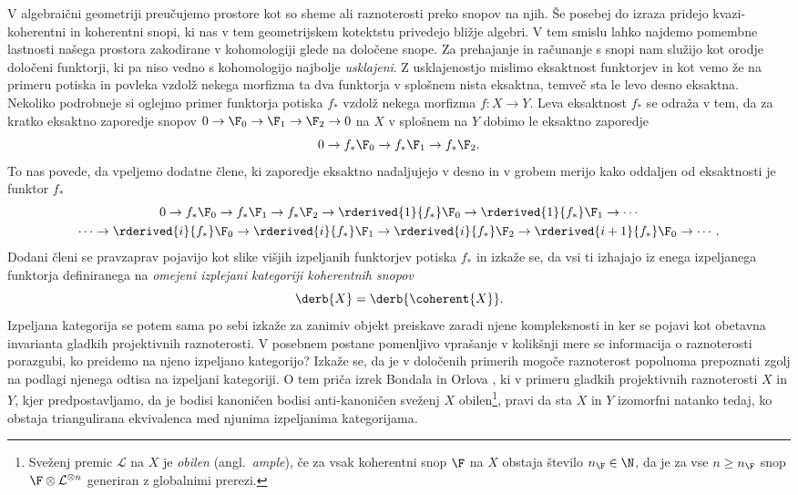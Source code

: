 

V algebraični geometriji preučujemo prostore kot so sheme ali raznoterosti preko snopov na njih. Še posebej do izraza pridejo kvazi-koherentni in koherentni snopi, ki nas v tem geometrijskem kotektstu privedejo bližje algebri. V tem smislu lahko najdemo pomembne lastnosti našega prostora zakodirane v kohomologiji glede na določene snope.
Za prehajanje in računanje s snopi nam služijo kot orodje določeni funktorji, ki pa niso vedno s kohomologijo najbolje \emph{usklajeni}. 
Z usklajenostjo mislimo eksaktnost funktorjev in kot vemo že na primeru potiska in povleka vzdolž nekega morfizma ta dva funktorja v splošnem nista eksaktna, temveč sta le levo \oz desno eksaktna. Nekoliko podrobneje si oglejmo primer funktorja potiska $f_*$ vzdolž nekega morfizma $f \colon X \to Y$. Leva eksaktnost $f_*$ se odraža v tem, da za kratko eksaktno zaporedje snopov $0 \to \F_0 \to \F_1 \to \F_2 \to 0$ na $X$ v splošnem na $Y$ dobimo le eksaktno zaporedje
\[
    0 \to f_*\F_0 \to f_*\F_1 \to f_*\F_2.
\]
To nas povede, da vpeljemo dodatne člene, ki zaporedje eksaktno nadaljujejo v desno in v grobem merijo kako oddaljen od eksaktnosti je funktor $f_*$
\begin{multline*}
    0 \to f_*\F_0 \to f_*\F_1 \to f_*\F_2 \to \rderived{1}{f_*}\F_0 \to \rderived{1}{f_*}\F_1 \to \cdots \\
    \cdots \to \rderived{i}{f_*}\F_0 \to \rderived{i}{f_*}\F_1 \to \rderived{i}{f_*}\F_2 \to \rderived{i+1}{f_*}\F_0 \to \cdots.
\end{multline*}
Dodani členi se pravzaprav pojavijo kot slike višjih izpeljanih funktorjev potiska $f_*$ in izkaže se, da vsi ti izhajajo iz enega izpeljanega funktorja definiranega na \emph{omejeni izplejani kategoriji koherentnih snopov}
\[
    \derb{X} = \derb{\coherent{X}}.
\]
Izpeljana kategorija se potem sama po sebi izkaže za zanimiv objekt preiskave zaradi njene kompleksnosti in ker se pojavi kot obetavna invarianta gladkih projektivnih raznoterosti. V posebnem postane pomenljivo vprašanje v kolikšnji mere se informacija o raznoterosti porazgubi, ko preidemo na njeno izpeljano kategorijo? 
Izkaže se, da je v določenih primerih mogoče raznoterost popolnoma prepoznati zgolj na podlagi njenega odtisa na izpeljani kategoriji. O tem priča izrek Bondala in Orlova \cite{BondalOrlov2001}, ki v primeru gladkih projektivnih raznoterosti $X$ in $Y$, kjer predpostavljamo, da je bodisi kanoničen bodisi anti-kanoničen sveženj $X$ obilen\footnote{
    Sveženj premic $\mathcal L$ na $X$ je \emph{obilen} (angl.~\emph{ample}), če za vsak koherentni snop $\F$ na $X$ obstaja število $n_\F \in \N$, da je za vse $n \geq n_\F$ snop $\F \otimes \mathcal L^{\otimes n}$ generiran z globalnimi prerezi.
}, pravi da sta $X$ in $Y$ izomorfni natanko tedaj, ko obstaja triangulirana ekvivalenca med njunima izpeljanima kategorijama. 
